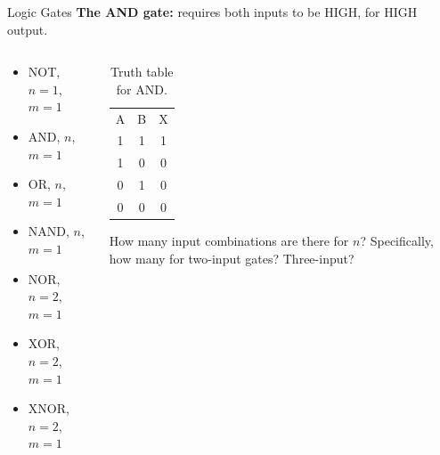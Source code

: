 \documentclass{beamer}
\begin{document}
\begin{frame}{Logic Gates}
\textbf{The AND gate:} requires both inputs to be HIGH, for HIGH output. \\ \vspace{0.5cm}
\begin{columns}[T]
\begin{column}{0.5\textwidth}
\begin{itemize}
\item \alert{NOT, $n=1$, $m=1$}
\item \alert{AND, $n$, $m=1$}
\item OR, $n$, $m=1$
\item NAND, $n$, $m=1$
\item NOR, $n=2$, $m=1$
\item XOR, $n=2$, $m=1$
\item XNOR, $n=2$, $m=1$
\end{itemize}
\end{column}
\begin{column}{0.5\textwidth}
\begin{table}
\begin{tabular}{c c c}
A & B & X \\
1 & 1 & 1 \\
1 & 0 & 0 \\
0 & 1 & 0 \\
0 & 0 & 0
\end{tabular}
\caption{\label{tab:AND} Truth table for AND.}
\end{table}
\small 
How many input combinations are there for $n$?  Specifically, how many for two-input gates?  Three-input?
\end{column}
\end{columns}
\end{frame}
\end{document}
